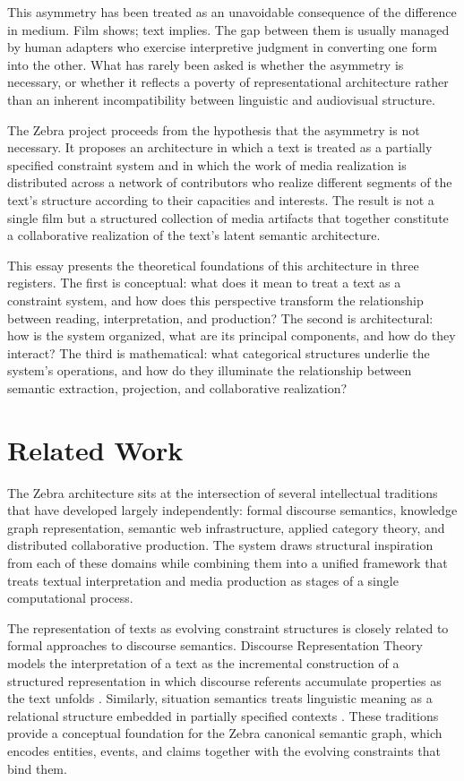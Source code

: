 \documentclass[12pt,a4paper]{article}
\begin{document}
This asymmetry has been treated as an unavoidable consequence of the difference in medium. Film shows; text implies. The gap between them is usually managed by human adapters who exercise interpretive judgment in converting one form into the other. What has rarely been asked is whether the asymmetry is necessary, or whether it reflects a poverty of representational architecture rather than an inherent incompatibility between linguistic and audiovisual structure.

The Zebra project proceeds from the hypothesis that the asymmetry is not necessary. It proposes an architecture in which a text is treated as a partially specified constraint system and in which the work of media realization is distributed across a network of contributors who realize different segments of the text's structure according to their capacities and interests. The result is not a single film but a structured collection of media artifacts that together constitute a collaborative realization of the text's latent semantic architecture.

This essay presents the theoretical foundations of this architecture in three registers. The first is conceptual: what does it mean to treat a text as a constraint system, and how does this perspective transform the relationship between reading, interpretation, and production? The second is architectural: how is the system organized, what are its principal components, and how do they interact? The third is mathematical: what categorical structures underlie the system's operations, and how do they illuminate the relationship between semantic extraction, projection, and collaborative realization?

\section{Related Work}

The Zebra architecture sits at the intersection of several intellectual traditions that have developed largely independently: formal discourse semantics, knowledge graph representation, semantic web infrastructure, applied category theory, and distributed collaborative production. The system draws structural inspiration from each of these domains while combining them into a unified framework that treats textual interpretation and media production as stages of a single computational process.

The representation of texts as evolving constraint structures is closely related to formal approaches to discourse semantics. Discourse Representation Theory models the interpretation of a text as the incremental construction of a structured representation in which discourse referents accumulate properties as the text unfolds \cite{kamp1993}. Similarly, situation semantics treats linguistic meaning as a relational structure embedded in partially specified contexts \cite{barwise1983}. These traditions provide a conceptual foundation for the Zebra canonical semantic graph, which encodes entities, events, and claims together with the evolving constraints that bind them.
\end{document}
